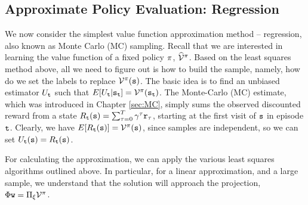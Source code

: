 

\subsection{Approximate Policy Evaluation: Regression}

We now consider the simplest value function approximation method -- regression, also known as Monte Carlo (MC) sampling. Recall that we are interested in learning the value function of a fixed policy $\pi$, $\widehat{\mathcal{V}}^{\pi}$.
Based on the least squares method above, all we need to figure out is how to build the sample, namely, how do we set the labels to
replace $\mathcal{V}^\pi ({\tt s})$. The basic idea is to find an
unbiased estimator $U_{\tt t}$ such that $E[U_{\tt t}
|{\tt s}_{\tt t}]=\mathcal{V}^\pi({\tt s}_{\tt t})$. The Monte-Carlo (MC) estimate, which was introduced in Chapter \ref{sec:MC}, simply sums the observed discounted reward from a state $R_{\tt t}({\tt s})=\sum_{\tau=0}^T
\gamma^\tau {\tt r}_\tau$, starting at the first visit of ${\tt s}$ in episode
${\tt t}$. Clearly, we have
$E[R_{\tt t}({\tt s})]=\mathcal{V}^\pi({\tt s})$, since samples are
independent, so we can set $U_{\tt t}({\tt s})=R_{\tt t}({\tt s})$. 


For calculating the approximation, we can apply the various least squares algorithms outlined above. In particular, for a linear approximation, and a large sample, we understand that the solution will approach the projection, $\Phi {\tt w} = \Pi_\xi \mathcal{V}^\pi$.

